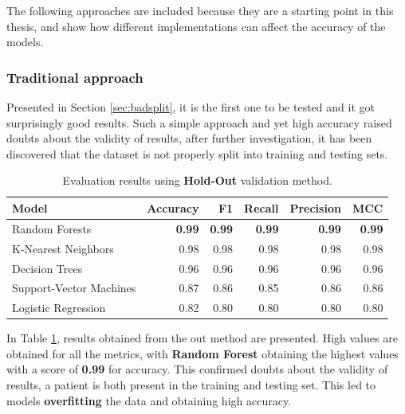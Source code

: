             The following approaches are included because they are a starting point in this thesis, and show how different implementations can affect the accuracy of the models.
            
            \subsubsection{Traditional approach}
                
                Presented in Section \ref{sec:badsplit}, it is the first one to be tested and it got surprisingly good results. Such a simple approach and yet high accuracy raised doubts about the validity of results, after further investigation, it has been discovered that the dataset is not properly split into training and testing sets. 
            
                \begin{table}[htbp]
                    \centering
                    \begin{tabular}{lrrrrr}
                        \toprule
                        \textbf{Model} & \textbf{Accuracy} & \textbf{F1} & \textbf{Recall} & \textbf{Precision} & \textbf{MCC} \\
                        \midrule
                        Random Forests & \textbf{0.99} & \textbf{0.99} & \textbf{0.99} & \textbf{0.99} & \textbf{0.99} \\
                        K-Nearest Neighbors & 0.98 & 0.98 & 0.98 & 0.98 & 0.98 \\
                        Decision Trees & 0.96 & 0.96 & 0.96 & 0.96 & 0.96 \\
                        Support-Vector Machines & 0.87 & 0.86 & 0.85 & 0.86 & 0.86 \\
                        Logistic Regression & 0.82 & 0.80 & 0.80 & 0.80 & 0.80 \\
                        \bottomrule
                    \end{tabular}
                    \caption{Evaluation results using \textbf{Hold-Out} validation method.}
                    \label{tab:wrong_approach_holdout}
                \end{table}

                In Table \ref{tab:wrong_approach_holdout}, results obtained from the out method are presented. High values are obtained for all the metrics, with \textbf{Random Forest} obtaining the highest values with a score of \textbf{0.99} for accuracy. This confirmed doubts about the validity of results, a patient is both present in the training and testing set. This led to models \textbf{overfitting} the data and obtaining high accuracy.

